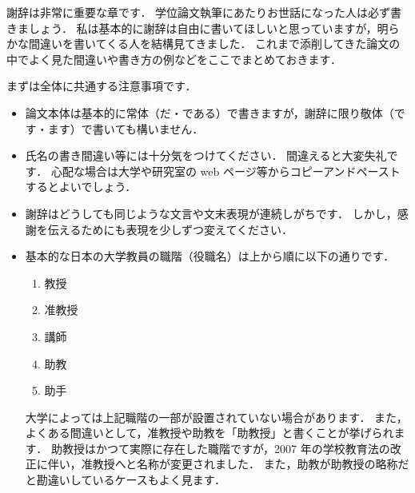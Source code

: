 \acknowledge

謝辞は非常に重要な章です．
学位論文執筆にあたりお世話になった人は必ず書きましょう．
私は基本的に謝辞は自由に書いてほしいと思っていますが，明らかな間違いを書いてくる人を結構見てきました．
これまで添削してきた論文の中でよく見た間違いや書き方の例などをここでまとめておきます．

まずは全体に共通する注意事項です．
\begin{itemize}
    \item 論文本体は基本的に常体（だ・である）で書きますが，謝辞に限り敬体（です・ます）で書いても構いません．
    \item 氏名の書き間違い等には十分気をつけてください．
    間違えると大変失礼です．
    心配な場合は大学や研究室の web ページ等からコピーアンドペーストするとよいでしょう．
    \item 謝辞はどうしても同じような文言や文末表現が連続しがちです．
    しかし，感謝を伝えるためにも表現を少しずつ変えてください．
    \item 基本的な日本の大学教員の職階（役職名）は上から順に以下の通りです．
    \begin{enumerate}
        \item 教授
        \item 准教授
        \item 講師
        \item 助教
        \item 助手
    \end{enumerate}
    大学によっては上記職階の一部が設置されていない場合があります．
    また，よくある間違いとして，准教授や助教を「助教授」と書くことが挙げられます．
    助教授はかつて実際に存在した職階ですが，2007 年の学校教育法の改正に伴い，准教授へと名称が変更されました．
    また，助教が助教授の略称だと勘違いしているケースもよく見ます．
\end{itemize}

